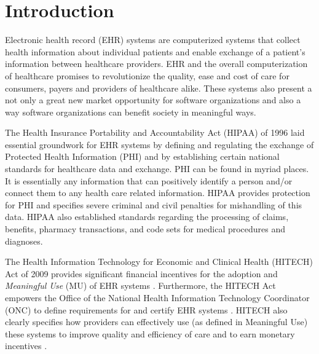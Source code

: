 \documentclass[10pt]{article}
\begin{document}
\section{Introduction}
\label{sec:Introduction}

Electronic health record (EHR) systems are computerized systems that collect health information about individual patients 
and enable exchange of a patient's information between healthcare providers.
EHR and the overall computerization of healthcare promises to revolutionize the quality, ease and cost of care for consumers, payers and providers of healthcare alike.
These systems also present a not only a great new market opportunity for software organizations and also a way software organizations can benefit society in meaningful ways.


The Health Insurance Portability and Accountability Act (HIPAA) of 1996 laid essential groundwork for EHR systems by defining and regulating the exchange of Protected Health Information (PHI) and by establishing certain national standards for healthcare data and exchange.
PHI can be found in myriad places. 
It is essentially any information that can positively identify a person and/or connect them to any health care related information.
HIPAA provides protection for PHI and specifies severe criminal and civil penalties for mishandling of this data.
HIPAA also established standards regarding the processing of claims, benefits, pharmacy transactions, and code sets for medical procedures and diagnoses. 
\cite{ehrbook}

The Health Information Technology for Economic and Clinical Health (HITECH) Act of 2009 provides significant financial incentives for the adoption and \textit{Meaningful Use} (MU) of EHR systems \cite{ehrbook}.
Furthermore, the HITECH Act empowers the Office of the National Health Information Technology Coordinator (ONC) to define requirements for and certify EHR systems \cite{onc-ehr}.
HITECH also clearly specifies how providers can effectively use (as defined in Meaningful Use) these systems to improve quality and efficiency of care and to earn monetary incentives \cite{ehrbook}.
\end{document}
